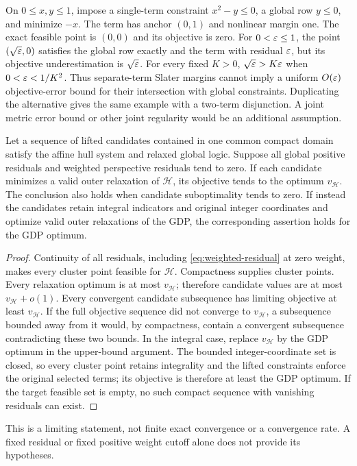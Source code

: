 \begin{example}\label{ex:intersection}
On $0\le x,y\le1$, impose a single-term constraint $x^2-y\le0$, a global row $y\le0$, and minimize $-x$. The term has anchor $(0,1)$ and nonlinear margin one. The exact feasible point is $(0,0)$ and its objective is zero. For $0<\varepsilon\le1$, the point $(\sqrt{\varepsilon},0)$ satisfies the global row exactly and the term with residual $\varepsilon$, but its objective underestimation is $\sqrt{\varepsilon}$. For every fixed $K>0$, $\sqrt{\varepsilon}>K\varepsilon$ when $0<\varepsilon<1/K^2$. Thus separate-term Slater margins cannot imply a uniform $O(\varepsilon)$ objective-error bound for their intersection with global constraints. Duplicating the alternative gives the same example with a two-term disjunction. A joint metric error bound or other joint regularity would be an additional assumption.
\end{example}

\begin{proposition}\label{prop:value}
Let a sequence of lifted candidates contained in one common compact domain satisfy the affine hull system and relaxed global logic. Suppose all global positive residuals and weighted perspective residuals tend to zero. If each candidate minimizes a valid outer relaxation of $\mathcal H$, its objective tends to the optimum $v_{\mathcal H}$. The conclusion also holds when candidate suboptimality tends to zero. If instead the candidates retain integral indicators and original integer coordinates and optimize valid outer relaxations of the GDP, the corresponding assertion holds for the GDP optimum.
\end{proposition}
\begin{proof}
Continuity of all residuals, including \eqref{eq:weighted-residual} at zero weight, makes every cluster point feasible for $\mathcal H$. Compactness supplies cluster points. Every relaxation optimum is at most $v_{\mathcal H}$; therefore candidate values are at most $v_{\mathcal H}+o(1)$. Every convergent candidate subsequence has limiting objective at least $v_{\mathcal H}$. If the full objective sequence did not converge to $v_{\mathcal H}$, a subsequence bounded away from it would, by compactness, contain a convergent subsequence contradicting these two bounds. In the integral case, replace $v_{\mathcal H}$ by the GDP optimum in the upper-bound argument. The bounded integer-coordinate set is closed, so every cluster point retains integrality and the lifted constraints enforce the original selected terms; its objective is therefore at least the GDP optimum. If the target feasible set is empty, no such compact sequence with vanishing residuals can exist.
\end{proof}
This is a limiting statement, not finite exact convergence or a convergence rate. A fixed residual or fixed positive weight cutoff alone does not provide its hypotheses.


